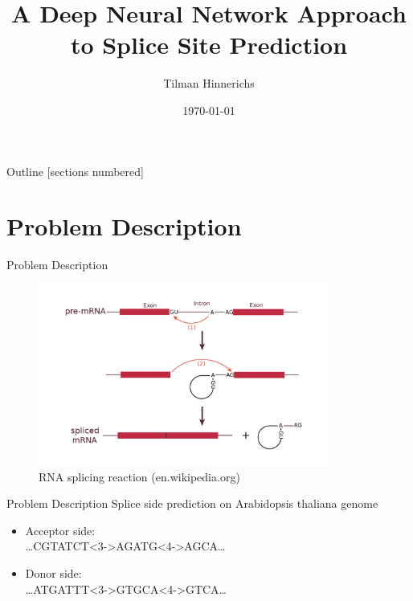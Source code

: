 \documentclass[10pt]{beamer}
\title{A Deep Neural Network Approach to Splice Site Prediction}
\author{Tilman Hinnerichs}
\institute{Knowledge Mining Lab -- KAUST}
\date{\today}
\begin{document}
	
\begin{frame}
	\titlepage
\end{frame}

\begin{frame}{Outline}
	[sections numbered]
	\tableofcontents
\end{frame}

\section{Problem Description}
\begin{frame}{Problem Description}
	\begin{figure}[ht]
		\centering
		\includegraphics[width = 0.85\textwidth]{RNA_splicing_reaction.png}
		\caption{RNA splicing reaction (en.wikipedia.org)}
	\end{figure}
\end{frame}

\begin{frame}{Problem Description}
	\large Splice side prediction on Arabidopsis thaliana genome
	\vspace{0.5cm}
	\pause
	\begin{itemize}
		\item Acceptor side:\\
		\dots CGTATCT<3->{AG}ATG<4->{AG}CA\dots
		\item Donor side:\\
		\dots ATGATTT<3->{GT}GCA<4->{GT}CA\dots
		
	\end{itemize}
\end{frame}
\end{document}
